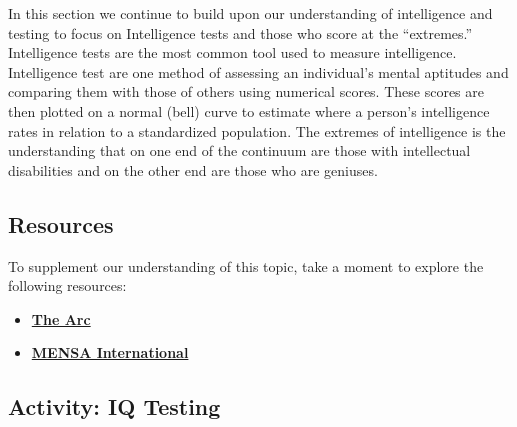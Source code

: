 \documentclass[
]{book}
\begin{document}
In this section we continue to build upon our understanding of intelligence and testing to focus on Intelligence tests and those who score at the ``extremes.'' Intelligence tests are the most common tool used to measure intelligence. Intelligence test are one method of assessing an individual's mental aptitudes and comparing them with those of others using numerical scores. These scores are then plotted on a normal (bell) curve to estimate where a person's intelligence rates in relation to a standardized population. The extremes of intelligence is the understanding that on one end of the continuum are those with intellectual disabilities and on the other end are those who are geniuses.

\hypertarget{resources-2}{%
\subsection*{Resources}\label{resources-2}}

To supplement our understanding of this topic, take a moment to explore the following resources:

\begin{itemize}
\item
  \href{https://thearc.org/}{\textbf{The Arc}}
\item
  \href{https://www.mensa.org}{\textbf{MENSA International}}
\end{itemize}

\hypertarget{activity-iq-testing}{%
\subsection*{Activity: IQ Testing}\label{activity-iq-testing}}
\end{document}
